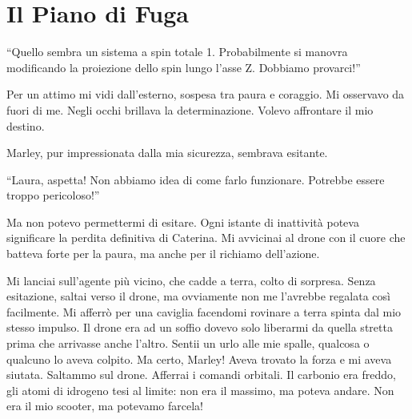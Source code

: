 \section{Il Piano di Fuga}

\begin{dialogue}
 \enquote{Quello sembra un sistema a spin totale 1. Probabilmente si manovra modificando la proiezione dello spin lungo l’asse Z. Dobbiamo provarci!}
\end{dialogue}

Per un attimo mi vidi dall'esterno, sospesa tra paura e coraggio. Mi osservavo da fuori di me. Negli occhi brillava la determinazione. Volevo affrontare il mio destino.


Marley, pur impressionata dalla mia sicurezza, sembrava esitante.

\begin{dialogue}
 \enquote{Laura, aspetta! Non abbiamo idea di come farlo funzionare. Potrebbe essere troppo pericoloso!}
\end{dialogue}

Ma non potevo permettermi di esitare. Ogni istante di inattività poteva significare la perdita definitiva di Caterina. Mi avvicinai al drone con il cuore che batteva forte per la paura, ma anche per il richiamo dell'azione.

Mi lanciai sull'agente più vicino, che cadde a terra, colto di sorpresa. Senza esitazione, saltai verso il drone, ma ovviamente non me l'avrebbe regalata così facilmente. Mi afferrò per una caviglia facendomi rovinare a terra spinta dal mio stesso impulso. Il drone era ad un soffio dovevo solo liberarmi da quella stretta prima che arrivasse anche l'altro. Sentii un urlo alle mie spalle, qualcosa o qualcuno lo aveva colpito. Ma certo, Marley! Aveva trovato la forza e mi aveva siutata. Saltammo  sul drone.  Afferrai i comandi orbitali. Il carbonio era freddo, gli atomi di idrogeno tesi al limite: non era il massimo, ma poteva andare. Non era il mio scooter, ma potevamo farcela!




